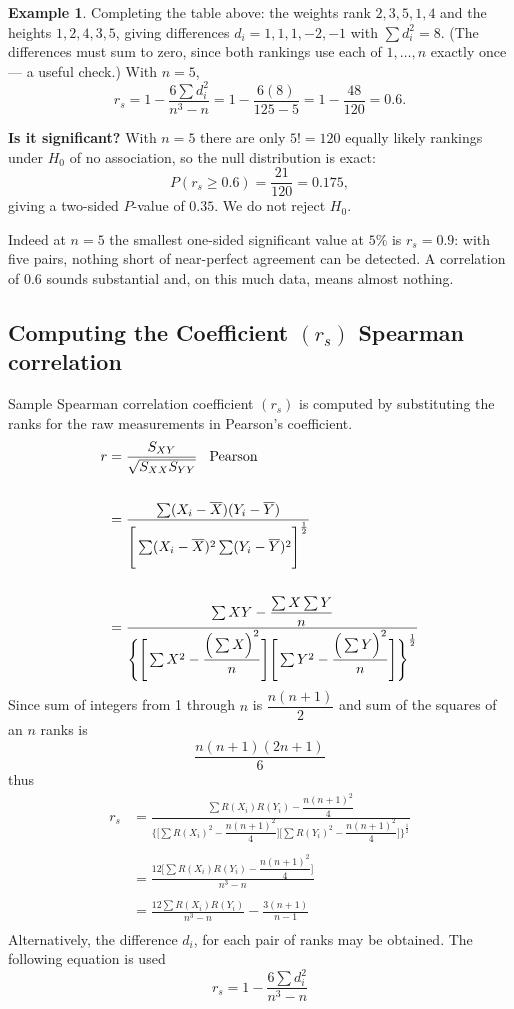 \documentclass[11pt,a4paper]{article}
\theoremstyle{definition}
\newtheorem{example}[thm]{Example}
\begin{document}
\begin{example}
Completing the table above: the weights rank $2,3,5,1,4$ and the heights
$1,2,4,3,5$, giving differences $d_i = 1, 1, 1, -2, -1$ with
$\sum d_i^{2} = 8$. (The differences must sum to zero, since both rankings use
each of $1,\ldots,n$ exactly once --- a useful check.) With $n = 5$,
$$r_s = 1 - \dfrac{6\sum d_i^{2}}{n^{3}-n}
= 1 - \dfrac{6(8)}{125-5} = 1 - \dfrac{48}{120} = 0.6 .$$

\textbf{Is it significant?} With $n = 5$ there are only $5! = 120$ equally likely
rankings under $H_0$ of no association, so the null distribution is exact:
$$P\left(r_s \geq 0.6\right) = \dfrac{21}{120} = 0.175 ,$$
giving a two-sided $P$-value of $0.35$. We do not reject $H_0$.

Indeed at $n = 5$ the smallest one-sided significant value at $5\%$ is
$r_s = 0.9$: with five pairs, nothing short of near-perfect agreement can be
detected. A correlation of $0.6$ sounds substantial and, on this much data, means
almost nothing.
\end{example}





\vspace{1cm}




\subsection{Computing the Coefficient $(r_s)$ Spearman correlation}
Sample Spearman correlation coefficient $(r_s)$  is computed by substituting the ranks for the raw measurements in Pearson's coefficient.
\begin{align*}
r &=\frac{S_{XY}}{\sqrt{S_{XX}S_{YY}}}\hspace{0.3cm}\text{Pearson}\\\\
  &=\frac{\sum (X_i-\overline{X})(Y_i-\overline{Y})}{\Bigg[\sum(X_i-\overline{X})^2\sum (Y_i-\overline{Y})^2\Bigg]^\frac{1}{2}}\\\\
  &=\frac{\sum XY-\dfrac{\sum X\sum Y}{n}}{\Bigg\{\Bigg[\sum X^2-\dfrac{\Big(\sum X\Big)^2}{n}\Bigg]\Bigg[\sum Y^2-\dfrac{\Big(\sum Y\Big)^2}{n}\Bigg]\Bigg\}^\frac{1}{2}}
\end{align*}
Since sum of integers from 1 through $n$ is $\dfrac{n(n+1)}{2}$ and sum of the squares of an $n$ ranks is $$\frac{n(n+1)(2n+1)}{6}$$ thus
\begin{align*}
r_s &=\frac{\sum R(X_i)R(Y_i)-\dfrac{n(n+1)^2}{4}}{\Bigg\{\Bigg[\sum R(X_i)^2-\dfrac{n(n+1)^2}{4}\Bigg]\Bigg[\sum R(Y_i)^2-\dfrac{n(n+1)^2}{4}\Bigg]\Bigg\}^\frac{1}{2}}\\\\
    &=\frac{12\Big[\sum R(X_i)R(Y_i)-\dfrac{n(n+1)^2}{4}\Big]}{n^3-n}\\\\
    &=\frac{12\sum R(X_i)R(Y_i)}{n^3-n}-\frac{3(n+1)}{n-1}\\
\end{align*}
Alternatively, the difference $d_i$, for each pair of ranks may be obtained. The following equation is used $$r_s=1-\frac{6\sum d_i^2}{n^3-n}$$
\end{document}
